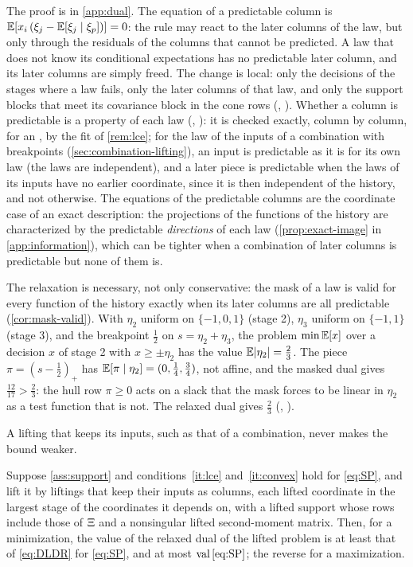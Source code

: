 The proof is in \cref{app:dual}.
The equation of a predictable column is $\mathbb{E}[x_i\,(\xi_j - \mathbb{E}[\xi_j\mid\xi_p])] = 0$: the rule may react to the later columns of the law, but only through the residuals of the columns that cannot be predicted.
A law that does not know its conditional expectations has no predictable later column, and its later columns are simply freed.
The change is local: only the decisions of the stages where a law fails, only the later columns of that law, and only the support blocks that meet its covariance block in the cone rows (, ).
Whether a column is predictable is a property of each law (, ):
it is checked exactly, column by column, for an , by the fit of \cref{rem:lce};
for the law of the inputs of a combination with breakpoints (\cref{sec:combination-lifting}), an input is predictable as it is for its own law (the laws are independent),
and a later piece is predictable when the laws of its inputs have no earlier coordinate, since it is then independent of the history, and not otherwise.
The equations of the predictable columns are the coordinate case of an exact description:
the projections of the functions of the history are characterized by the predictable \emph{directions} of each law (\cref{prop:exact-image} in \cref{app:information}),
which can be tighter when a combination of later columns is predictable but none of them is.

The relaxation is necessary, not only conservative:
the mask of a law is valid for every function of the history exactly when its later columns are all predictable (\cref{cor:mask-valid}).
With $\eta_2$ uniform on $\{-1, 0, 1\}$ (stage 2), $\eta_3$ uniform on $\{-1, 1\}$ (stage 3), and the breakpoint $\tfrac12$ on $s = \eta_2 + \eta_3$,
the problem $\min \mathbb{E}[x]$ over a decision $x$ of stage 2 with $x \ge \pm\eta_2$ has the value $\mathbb{E}\lvert \eta_2 \rvert = \tfrac23$.
The piece $\pi = (s - \tfrac12)_+$ has $\mathbb{E}[\pi\mid\eta_2] = (0, \tfrac14, \tfrac34)$, not affine, and the masked dual gives $\tfrac{12}{17} > \tfrac23$:
the hull row $\pi \ge 0$ acts on a slack that the mask forces to be linear in $\eta_2$ as a test function that is not.
The relaxed dual gives $\tfrac23$ (, ).

A lifting that keeps its inputs, such as that of a combination, never makes the bound weaker.

\begin{proposition}
\label{prop:relaxed-lifting}
Suppose \cref{ass:support} and conditions~\ref{it:lce} and~\ref{it:convex} hold for \eqref{eq:SP}, and lift it by liftings that keep their inputs as columns,
each lifted coordinate in the largest stage of the coordinates it depends on, with a lifted support whose rows include those of $\Xi$ and a nonsingular lifted second-moment matrix.
Then, for a minimization, the value of the relaxed dual of the lifted problem is at least that of \eqref{eq:DLDR} for \eqref{eq:SP}, and at most $\operatorname{val}\eqref{eq:SP}$; the reverse for a maximization.
\end{proposition}

